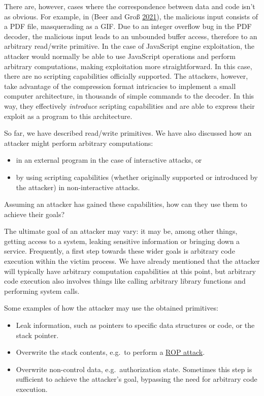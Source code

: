 \documentclass[a4paper,]{report}
\providecommand{\tightlist}{%
  \setlength{\itemsep}{0pt}\setlength{\parskip}{0pt}}
\begin{document}
There are, however, cases where the correspondence between data and code
isn't as obvious. For example, in (Beer and Groß
\protect\hyperlink{ref-Beer2021}{2021}), the malicious input consists of
a PDF file, masquerading as a GIF. Due to an integer overflow bug in the
PDF decoder, the malicious input leads to an unbounded buffer access,
therefore to an arbitrary read/write primitive. In the case of
JavaScript engine exploitation, the attacker would normally be able to
use JavaScript operations and perform arbitrary computations, making
exploitation more straightforward. In this case, there are no scripting
capabilities officially supported. The attackers, however, take
advantage of the compression format intricacies to implement a small
computer architecture, in thousands of simple commands to the decoder.
In this way, they effectively \emph{introduce} scripting capabilities
and are able to express their exploit as a program to this architecture.

So far, we have described read/write primitives. We have also discussed
how an attacker might perform arbitrary computations:

\begin{itemize}
\tightlist
\item
  in an external program in the case of interactive attacks, or
\item
  by using scripting capabilities (whether originally supported or
  introduced by the attacker) in non-interactive attacks.
\end{itemize}

Assuming an attacker has gained these capabilities, how can they use
them to achieve their goals?

The ultimate goal of an attacker may vary: it may be, among other
things, getting access to a system, leaking sensitive information or
bringing down a service. Frequently, a first step towards these wider
goals is arbitrary code execution within
the victim process. We have already mentioned that the attacker will
typically have arbitrary computation capabilities at this point, but
arbitrary code execution also involves things like calling arbitrary
library functions and performing system calls.

Some examples of how the attacker may use the obtained primitives:

\begin{itemize}
\tightlist
\item
  Leak information, such as pointers to specific data structures or
  code, or the stack pointer.
\item
  Overwrite the stack contents, e.g.~to perform a
  \protect\hyperlink{code-reuse-attacks}{ROP attack}.
\item
  Overwrite non-control data, e.g.~authorization state. Sometimes this
  step is sufficient to achieve the attacker's goal, bypassing the need
  for arbitrary code execution.
\end{itemize}
\end{document}
